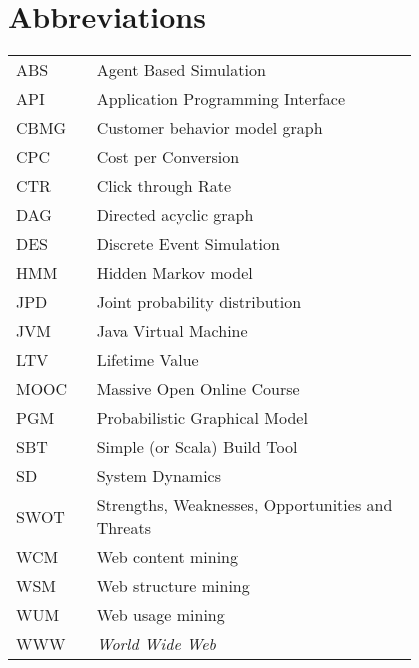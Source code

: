 \chapter*{Abbreviations}

\begin{flushleft}
\begin{tabular}{l p{0.8\linewidth}}
ABS      & Agent Based Simulation\\
API      & Application Programming Interface\\
CBMG     & Customer behavior model graph\\
CPC      & Cost per Conversion\\
CTR      & Click through Rate\\
DAG      & Directed acyclic graph\\
DES      & Discrete Event Simulation\\
HMM      & Hidden Markov model\\
JPD      & Joint probability distribution\\
JVM      & Java Virtual Machine\\
LTV      & Lifetime Value\\
MOOC     & Massive Open Online Course\\
PGM      & Probabilistic Graphical Model\\
SBT      & Simple (or Scala) Build Tool\\
SD       & System Dynamics\\
SWOT     & Strengths, Weaknesses, Opportunities and Threats\\
WCM      & Web content mining\\
WSM      & Web structure mining\\
WUM      & Web usage mining\\
WWW      & \emph{World Wide Web}
\end{tabular}
\end{flushleft}
